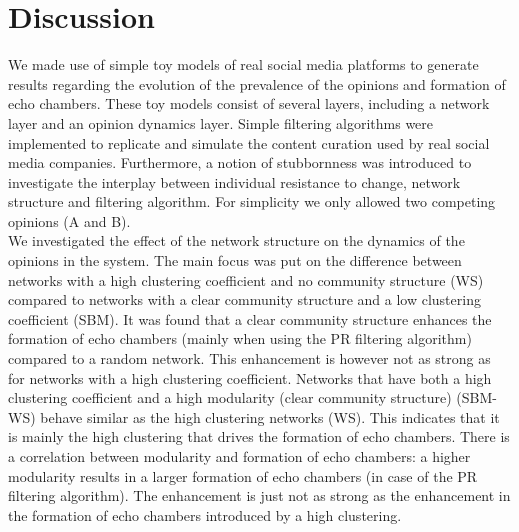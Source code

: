 \documentclass[11 pt , letterpaper , twoside , openright]{book}
\begin{document}
\chapter{Discussion}

We made use of simple toy models of real social media platforms to generate results regarding the evolution of the prevalence of the opinions and formation of echo chambers. These toy models consist of several layers, including a network layer and an opinion dynamics layer. Simple filtering algorithms were implemented to replicate and simulate the content curation used by real social media companies. Furthermore, a notion of stubbornness was introduced to investigate the interplay between individual resistance to change, network structure and filtering algorithm. For simplicity we only allowed two competing opinions (A and B).\\
\newline
We investigated the effect of the network structure on the dynamics of the opinions in the system. The main focus was put on the difference between networks with a high clustering coefficient and no community structure (WS) compared to networks with a clear community structure and a low clustering coefficient (SBM). It was found that a clear community structure enhances the formation of echo chambers (mainly when using the PR filtering algorithm) compared to a random network. This enhancement is however not as strong as for networks with a high clustering coefficient. Networks that have both a high clustering coefficient and a high modularity (clear community structure) (SBM-WS) behave similar as the high clustering networks (WS). This indicates that it is mainly the high clustering that drives the formation of echo chambers. There is a correlation between modularity and formation of echo chambers: a higher modularity results in a larger formation of echo chambers (in case of the PR filtering algorithm). The enhancement is just not as strong as the enhancement in the formation of echo chambers introduced by a high clustering. \\
\newline
\end{document}
